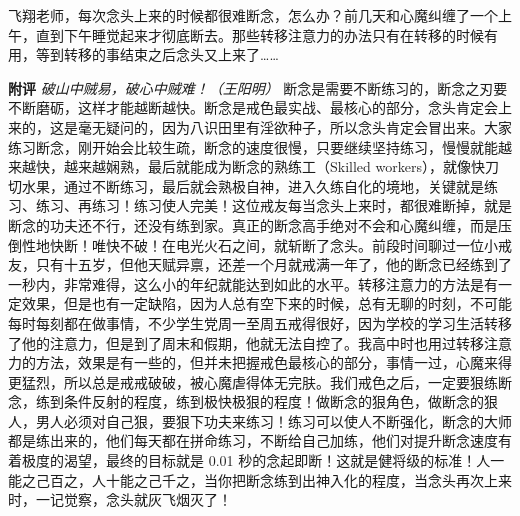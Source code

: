 \begin{case}
    飞翔老师，每次念头上来的时候都很难断念，怎么办？前几天和心魔纠缠了一个上午，直到下午睡觉起来才彻底断去。那些转移注意力的办法只有在转移的时候有用，等到转移的事结束之后念头又上来了……

    \textbf{附评} \textit{破山中贼易，破心中贼难！（王阳明）} 断念是需要不断练习的，断念之刃要不断磨砺，这样才能越断越快。断念是戒色最实战、最核心的部分，念头肯定会上来的，这是毫无疑问的，因为八识田里有淫欲种子，所以念头肯定会冒出来。大家练习断念，刚开始会比较生疏，断念的速度很慢，只要继续坚持练习，慢慢就能越来越快，越来越娴熟，最后就能成为断念的熟练工（Skilled workers），就像快刀切水果，通过不断练习，最后就会熟极自神，进入久练自化的境地，关键就是练习、练习、再练习！练习使人完美！这位戒友每当念头上来时，都很难断掉，就是断念的功夫还不行，还没有练到家。真正的断念高手绝对不会和心魔纠缠，而是压倒性地快断！唯快不破！在电光火石之间，就斩断了念头。前段时间聊过一位小戒友，只有十五岁，但他天赋异禀，还差一个月就戒满一年了，他的断念已经练到了一秒内，非常难得，这么小的年纪就能达到如此的水平。转移注意力的方法是有一定效果，但是也有一定缺陷，因为人总有空下来的时候，总有无聊的时刻，不可能每时每刻都在做事情，不少学生党周一至周五戒得很好，因为学校的学习生活转移了他的注意力，但是到了周末和假期，他就无法自控了。我高中时也用过转移注意力的方法，效果是有一些的，但并未把握戒色最核心的部分，事情一过，心魔来得更猛烈，所以总是戒戒破破，被心魔虐得体无完肤。我们戒色之后，一定要狠练断念，练到条件反射的程度，练到极快极狠的程度！做断念的狠角色，做断念的狠人，男人必须对自己狠，要狠下功夫来练习！练习可以使人不断强化，断念的大师都是练出来的，他们每天都在拼命练习，不断给自己加练，他们对提升断念速度有着极度的渴望，最终的目标就是 0.01 秒的念起即断！这就是健将级的标准！人一能之己百之，人十能之己千之，当你把断念练到出神入化的程度，当念头再次上来时，一记觉察，念头就灰飞烟灭了！
\end{case}

